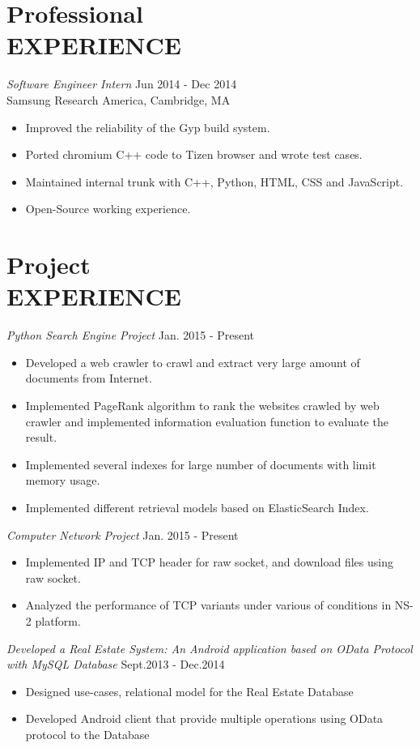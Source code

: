 \documentclass[margin, 10pt]{res}%
\begin{document}
\begin{resume}
\section{Professional \\ EXPERIENCE}
{\sl Software Engineer Intern} \hfill  Jun 2014 - Dec 2014 \\
 Samsung Research America, Cambridge, MA
\begin{itemize} \itemsep -2pt %
\item Improved the reliability of the Gyp build system.
\item Ported chromium C++ code to Tizen browser and wrote test cases.
\item Maintained internal trunk with C++, Python, HTML, CSS and JavaScript.
\item Open-Source working experience.
\end{itemize}


\section{Project \\ EXPERIENCE}

{\sl Python Search Engine Project} \hfill Jan. 2015 - Present
\begin{itemize}
\item Developed a web crawler to crawl and extract very large amount of documents from Internet.
\item Implemented PageRank algorithm to rank the websites crawled by web crawler and implemented information evaluation function to evaluate the result.
\item Implemented several indexes for large number of documents with limit memory usage.
\item Implemented different retrieval models based on ElasticSearch Index.
\end{itemize}

{\sl Computer Network Project }\hfill Jan. 2015 - Present
\begin{itemize}
\item Implemented IP and TCP header for raw socket, and download files using raw socket.
\item Analyzed the performance of TCP variants under various of conditions in NS-2 platform.
\end{itemize}
{\sl Developed a Real Estate System: An Android application based on OData Protocol with MySQL Database} \hfill Sept.2013 - Dec.2014
\begin{itemize}
\item Designed use-cases, relational model for the Real Estate Database
\item Developed Android client that provide multiple operations using OData protocol to the Database
\end{itemize}



\end{resume}
\end{document}
